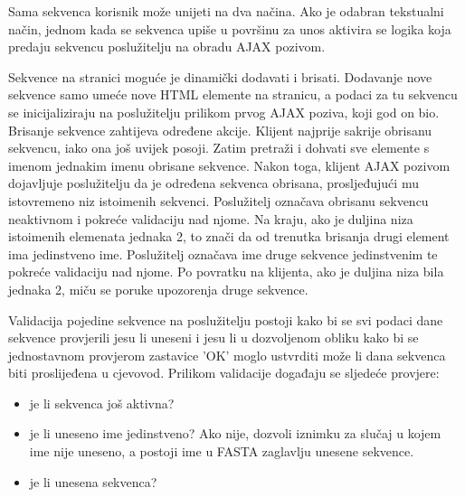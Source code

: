 Sama sekvenca korisnik može unijeti na dva načina. Ako je odabran tekstualni
način, jednom kada se sekvenca upiše u površinu za unos aktivira se logika koja
predaju sekvencu poslužitelju na obradu AJAX pozivom. 

Sekvence na stranici moguće je dinamički dodavati i brisati. Dodavanje nove
sekvence samo umeće nove HTML elemente na stranicu, a podaci za tu sekvencu se
inicijaliziraju na poslužitelju prilikom prvog AJAX poziva, koji god on bio.
Brisanje sekvence zahtijeva određene akcije. Klijent najprije sakrije obrisanu
sekvencu, iako ona još uvijek posoji. Zatim pretraži i dohvati sve elemente s
imenom jednakim imenu obrisane sekvence. Nakon toga, klijent AJAX pozivom
dojavljuje poslužitelju da je određena sekvenca obrisana, prosljeđujući mu
istovremeno niz istoimenih sekvenci. Poslužitelj označava obrisanu sekvencu
neaktivnom i pokreće validaciju nad njome. Na kraju, ako je duljina niza
istoimenih elemenata jednaka 2, to znači da od trenutka brisanja drugi element
ima jedinstveno ime. Poslužitelj označava ime druge sekvence jedinstvenim te
pokreće validaciju nad njome. Po povratku na klijenta, ako je duljina niza bila
jednaka 2, miču se poruke upozorenja druge sekvence.

Validacija pojedine sekvence na poslužitelju postoji kako bi se svi podaci dane
sekvence provjerili jesu li uneseni i jesu li u dozvoljenom obliku kako bi se
jednostavnom provjerom zastavice 'OK' moglo ustvrditi može li dana sekvenca biti
proslijeđena u cjevovod. Prilikom validacije događaju se sljedeće provjere:

\begin{itemize}

\item je li sekvenca još aktivna?

\item je li uneseno ime jedinstveno? Ako nije, dozvoli iznimku za slučaj u kojem
ime nije uneseno, a postoji ime u FASTA zaglavlju unesene sekvence.

\item je li unesena sekvenca?

\end{itemize}

